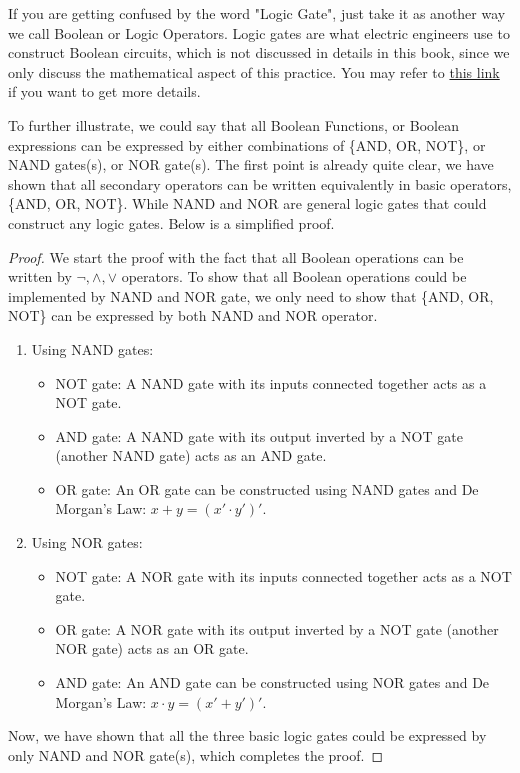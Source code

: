     \begin{remark}
        If you are getting confused by the word "Logic Gate", just take it as another way we call Boolean or Logic Operators. Logic gates are what electric engineers use
        to construct Boolean circuits, which is not discussed in details in this book, since we only discuss the mathematical aspect of this practice. You may refer
        to \href{https://www.wikiwand.com/en/Logic_gate}{this link}
        if you want to get more details. 
    \end{remark}
    To further illustrate, we could say that all Boolean Functions, or Boolean expressions can be expressed by either combinations of \{AND, OR, NOT\}, or NAND gates(s), or NOR gate(s).
    The first point is already quite clear, we have shown that all secondary operators can be written equivalently in basic operators, \{AND, OR, NOT\}. While NAND and NOR are general 
    logic gates that could construct any logic gates. Below is a simplified proof.
    \begin{proof}
        We start the proof with the fact that all Boolean operations can be written by $\lnot, \land, \lor$ operators.
        To show that all Boolean operations could be implemented by NAND and NOR gate, we only need to show that \{AND, OR, NOT\} can be expressed by both NAND and NOR operator.
        \begin{enumerate}
            \item Using NAND gates:
            \begin{itemize}
                \item NOT gate: A NAND gate with its inputs connected together acts as a NOT gate.
                \item AND gate: A NAND gate with its output inverted by a NOT gate (another NAND gate) acts as an AND gate.
                \item OR gate: An OR gate can be constructed using NAND gates and De Morgan's Law: $x + y = (x' \cdot y')'$.
            \end{itemize}
        
            \item Using NOR gates:
            \begin{itemize}
                \item NOT gate: A NOR gate with its inputs connected together acts as a NOT gate.
                \item OR gate: A NOR gate with its output inverted by a NOT gate (another NOR gate) acts as an OR gate.
                \item AND gate: An AND gate can be constructed using NOR gates and De Morgan's Law: $x \cdot y = (x' + y')'$.
            \end{itemize}
        \end{enumerate}
    Now, we have shown that all the three basic logic gates could be expressed by only NAND and NOR gate(s), which completes the proof.
    \end{proof}

